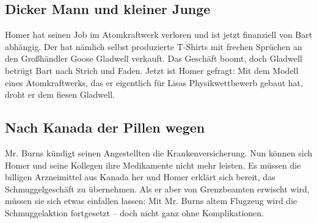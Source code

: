 \subsection{Dicker Mann und kleiner Junge}
Homer hat seinen Job im Atomkraftwerk verloren und ist jetzt finanziell von Bart abhängig. Der hat nämlich selbst produzierte T-Shirts mit frechen Sprü\-chen an den Großhändler Goose Gladwell verkauft. Das Geschäft boomt, doch Gladwell betrügt Bart nach Strich und Faden. Jetzt ist Homer gefragt: Mit dem Modell eines Atomkraftwerks, das er eigentlich für Lisas Physikwettbewerb gebaut hat, droht er dem fiesen Gladwell.


\subsection{Nach Kanada der Pillen wegen}\label{FABF16}
Mr. Burns kündigt seinen Angestellten die Krankenversicherung. Nun können sich Homer und seine Kollegen ihre Medikamente nicht mehr leisten. Es müssen die billigen Arzneimittel aus Kanada her und Homer erklärt sich bereit, das Schmuggelgeschäft zu übernehmen. Als er aber von Grenzbeamten erwischt wird, müssen sie sich etwas einfallen lassen: Mit Mr. Burns altem Flugzeug wird die Schmuggelaktion fortgesetzt -- doch nicht ganz ohne Komplikationen.

